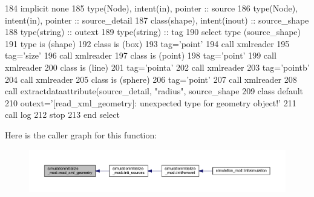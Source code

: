 \begin{DoxyCode}
184     \textcolor{keywordtype}{implicit none}
185     \textcolor{keywordtype}{type}(Node), \textcolor{keywordtype}{intent(in)}, \textcolor{keywordtype}{pointer} :: source
186     \textcolor{keywordtype}{type}(Node), \textcolor{keywordtype}{intent(in)}, \textcolor{keywordtype}{pointer} :: source\_detail
187     \textcolor{keywordtype}{class}(shape), \textcolor{keywordtype}{intent(inout)} :: source\_shape
188     \textcolor{keywordtype}{type}(string) :: outext
189     \textcolor{keywordtype}{type}(string) :: tag
190     \textcolor{keywordflow}{select type} (source\_shape)
191 \textcolor{keywordflow}{    type is} (shape)
192 \textcolor{keywordflow}{    class is} (box)
193         tag=\textcolor{stringliteral}{'point'}
194         \textcolor{keyword}{call }xmlreader%
195         tag=\textcolor{stringliteral}{'size'}
196         \textcolor{keyword}{call }xmlreader%
197 \textcolor{keywordflow}{    class is} (point)
198         tag=\textcolor{stringliteral}{'point'}
199         \textcolor{keyword}{call }xmlreader%
200 \textcolor{keywordflow}{    class is} (line)
201         tag=\textcolor{stringliteral}{'pointa'}
202         \textcolor{keyword}{call }xmlreader%
203         tag=\textcolor{stringliteral}{'pointb'}
204         \textcolor{keyword}{call }xmlreader%
205 \textcolor{keywordflow}{    class is} (sphere)
206         tag=\textcolor{stringliteral}{'point'}
207         \textcolor{keyword}{call }xmlreader%
208         \textcolor{keyword}{call }extractdataattribute(source\_detail, \textcolor{stringliteral}{"radius"}, source\_shape%
209 \textcolor{keywordflow}{        class default}
210         outext=\textcolor{stringliteral}{'[read\_xml\_geometry]: unexpected type for geometry object!'}
211         \textcolor{keyword}{call }log%
212         stop
213 \textcolor{keywordflow}{    end select}
\end{DoxyCode}
Here is the caller graph for this function\+:\nopagebreak
\begin{figure}[H]
\begin{center}
\leavevmode
\includegraphics[width=350pt]{namespacesimulationinitialize__mod_ab65ac868a57f2cc124ec29f87a239424_icgraph}
\end{center}
\end{figure}
